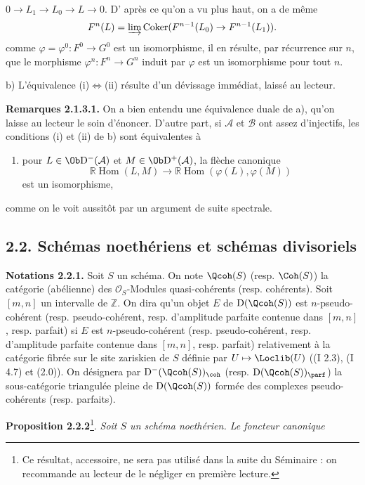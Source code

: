 $0\to L_1\to L_0\to L\to0$. D'%
après ce qu'on a vu plus haut, on a de même
\[
F^n(L)=\varinjlim\operatorname{Coker}(F^{n-1}(L_0)\to F^{n-1}(L_1)).
\]
comme $\varphi=\varphi^0:F^0\to G^0$ est un isomorphisme, il en résulte, par récurrence sur $n$, que le morphisme $\varphi^n:F^n\to G^n$ induit par $\varphi$ est un isomorphisme pour tout $n$.

b) L'équivalence (i)$\Leftrightarrow$(ii) résulte d'un dévissage immédiat, laissé au lecteur.

\textbf{Remarques 2.1.3.1.} On a bien entendu une équivalence duale de a), qu'on laisse au lecteur le soin d'énoncer. D'autre part, si $\mathcal A$ et $\mathcal B$ ont assez d'injectifs, les conditions (i) et (ii) de b) sont équivalentes à
\begin{enumerate}[label=(\roman*),start=3]
\item pour $L\in\Ob\mathrm D^{-}(\mathcal A)$ et $M\in\Ob\mathrm D^{+}(\mathcal A)$, la flèche canonique
\[
\mathbb R\!\operatorname{Hom}(L,M)\longrightarrow
\mathbb R\!\operatorname{Hom}(\varphi(L),\varphi(M))
\]
est un isomorphisme,
\end{enumerate}
comme on le voit aussitôt par un argument de suite spectrale.

\subsection*{2.2. Schémas noethériens et schémas divisoriels}

\textbf{Notations 2.2.1.} Soit $S$ un schéma. On note $\Qcoh(S)$ (resp. $\Coh(S)$) la catégorie (abélienne) des $\mathcal O_S$-Modules quasi-cohérents (resp. cohérents). Soit $[m,n]$ un intervalle de $\mathbb Z$. On dira qu'un objet $E$ de $\mathrm D(\Qcoh(S))$ est $n$-pseudo-cohérent (resp. pseudo-cohérent, resp. d'amplitude parfaite contenue dans $[m,n]$, resp. parfait) si $E$ est $n$-pseudo-cohérent (resp. pseudo-cohérent, resp. d'amplitude parfaite contenue dans $[m,n]$, resp. parfait) relativement à la catégorie fibrée sur le site zariskien de $S$ définie par $U\mapsto\Loclib(U)$ ((I 2.3), (I 4.7) et (2.0)). On désignera par $\mathrm D^{-}(\Qcoh(S))_{\coh}$ (resp. $\mathrm D(\Qcoh(S))_{\parf}$) la sous-catégorie triangulée pleine de $\mathrm D(\Qcoh(S))$ formée des complexes pseudo-cohérents (resp. parfaits).

\textbf{Proposition 2.2.2}\footnote{Ce résultat, accessoire, ne sera pas utilisé dans la suite du Séminaire : on recommande au lecteur de le négliger en première lecture.}. \emph{Soit $S$ un schéma noethérien. Le foncteur}
\emph{canonique}
